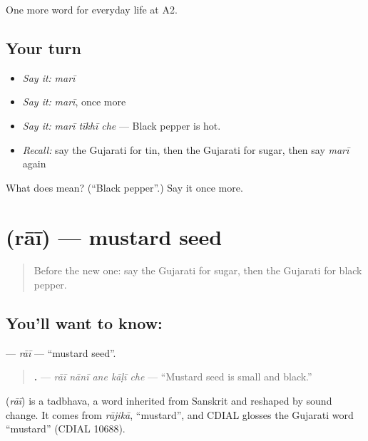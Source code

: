 \begin{grammarlens}[title={What you've built}]
One more word for everyday life at A2.
\end{grammarlens}

\subsection*{Your turn}
\begin{itemize}
\raggedright
  \item \emph{Say it:} \emph{marī}
  \item \emph{Say it:} \emph{marī}, once more
  \item \emph{Say it:} \emph{marī tīkhī che} — Black pepper is hot.
  \item \emph{Recall:} say the Gujarati for tin, then the Gujarati for sugar, then say \emph{marī} again
\end{itemize}

\begin{tcolorbox}[breakable,colback=teal!4,colframe=teal!35!black,title={Before you move on}]
What does  mean? (\textquotedblleft{}Black pepper\textquotedblright{}.) Say it once more.
\end{tcolorbox}
\section[\texorpdfstring{\gu{રાઈ} (rāī)}{રાઈ (rāī)}]{ (rāī) — mustard seed}

\label{lesson:GU-C164-rai}



\begin{quote}
Before the new one: say the Gujarati for sugar, then the Gujarati for black pepper.
\end{quote}

\subsection*{You'll want to know: }
\textbf{} — \emph{rāī} — \textquotedblleft{}mustard seed\textquotedblright{}.

\begin{quote}
\textbf{    .} — \emph{rāī nānī ane kāḷī che} — \textquotedblleft{}Mustard seed is small and black.\textquotedblright{}
\end{quote}

\begin{cousinweb}
\textbf{} (\emph{rāī}) is a tadbhava, a word inherited from Sanskrit and reshaped by sound change. It comes from \emph{rājikā}, \textquotedblleft{}mustard\textquotedblright{}, and CDIAL glosses the Gujarati word \textquotedblleft{}mustard\textquotedblright{} (CDIAL 10688).
\end{cousinweb}

